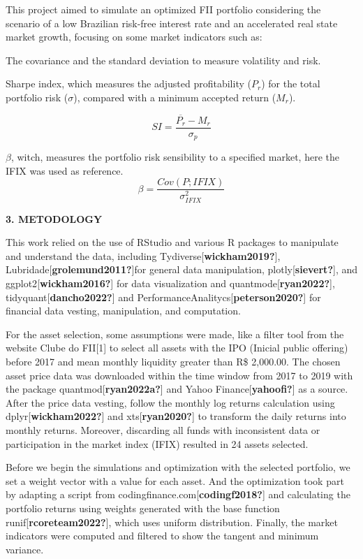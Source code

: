 \documentclass[
]{article}
\begin{document}
This project aimed to simulate an optimized FII portfolio considering
the scenario of a low Brazilian risk-free interest rate and an
accelerated real state market growth, focusing on some market indicators
such as:

The covariance and the standard deviation to measure volatility and
risk.

Sharpe index, which measures the adjusted profitability (\(P_r\)) for
the total portfolio risk (\(\sigma\)), compared with a minimum accepted
return (\(M_r\)).

\[ SI=\frac{\overline{P_r}-M_r}{\sigma_{p}} \]

\(\beta\), witch, measures the portfolio risk sensibility to a specified
market, here the IFIX was used as
reference.\[\beta=\frac{Cov(P;IFIX)}{\sigma_{IFIX}^2}\]

\begin{center}
\textbf{3. METODOLOGY}
\end{center}

This work relied on the use of RStudio and various R packages to
manipulate and understand the data, including
Tydiverse{[}\textbf{wickham2019?}{]},
Lubridade{[}\textbf{grolemund2011?}{]}for general data manipulation,
plotly{[}\textbf{sievert?}{]}, and ggplot2{[}\textbf{wickham2016?}{]}
for data visualization and quantmode{[}\textbf{ryan2022?}{]},
tidyquant{[}\textbf{dancho2022?}{]} and
PerformanceAnalitycs{[}\textbf{peterson2020?}{]} for financial data
vesting, manipulation, and computation.

For the asset selection, some assumptions were made, like a filter tool
from the website Clube do FII{[}1{]} to select all assets with the IPO
(Inicial public offering) before 2017 and mean monthly liquidity greater
than R\$ 2,000.00. The chosen asset price data was downloaded within the
time window from 2017 to 2019 with the package
quantmod{[}\textbf{ryan2022a?}{]} and Yahoo
Finance{[}\textbf{yahoofi?}{]} as a source. After the price data
vesting, follow the monthly log returns calculation using
dplyr{[}\textbf{wickham2022?}{]} and xts{[}\textbf{ryan2020?}{]} to
transform the daily returns into monthly returns. Moreover, discarding
all funds with inconsistent data or participation in the market index
(IFIX) resulted in 24 assets selected.

Before we begin the simulations and optimization with the selected
portfolio, we set a weight vector with a value for each asset. And the
optimization took part by adapting a script from
codingfinance.com{[}\textbf{codingf2018?}{]} and calculating the
portfolio returns using weights generated with the base function
runif{[}\textbf{rcoreteam2022?}{]}, which uses uniform distribution.
Finally, the market indicators were computed and filtered to show the
tangent and minimum variance.
\end{document}
